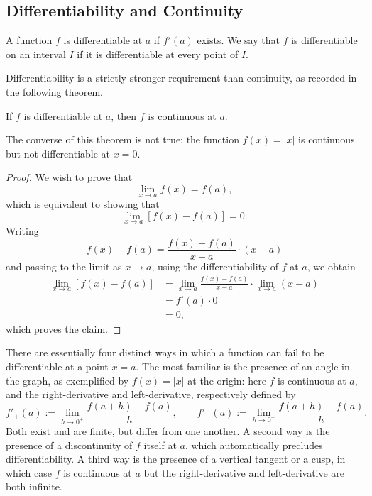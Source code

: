 

\subsection{Differentiability and Continuity}

\begin{definition}
A function $f$ is differentiable at $a$ if $f'(a)$ exists. We say that $f$ is differentiable on an interval $I$ if it is differentiable at every point of $I$.
\end{definition}

Differentiability is a strictly stronger requirement than continuity, as recorded in the following theorem.

\begin{theorem}
If $f$ is differentiable at $a$, then $f$ is continuous at $a$.
\end{theorem}

\begin{remark}
The converse of this theorem is not true: the function $f(x) = |x|$ is continuous but not differentiable at $x = 0$.
\end{remark}

\begin{proof}
We wish to prove that \[
\lim_{x \to a} f(x) = f(a),
\] which is equivalent to showing that
\[
\lim_{x \to a} [f(x) - f(a)] = 0.
\]
Writing
\[
f(x) - f(a) = \frac{f(x) - f(a)}{x - a} \cdot (x-a)
\]
 and passing to the limit as $x \to a$, using the differentiability of $f$ at $a$, we obtain
\[
\begin{aligned}
\lim_{x \to a} [f(x) - f(a)] &= \lim_{x \to a} \frac{f(x) - f(a)}{x-a} \cdot \lim_{x \to a} (x-a) \\
&= f'(a) \cdot 0 \\
&= 0,
\end{aligned}
\]
which proves the claim.
\end{proof}

There are essentially four distinct ways in which a function can fail to be differentiable at a point $x = a$. The most familiar is the presence of an angle in the graph, as exemplified by $f(x) = |x|$ at the origin: here $f$ is continuous at $a$, and the right-derivative and left-derivative, respectively defined by
\[
f'_+(a) := \lim_{h \to 0^+} \frac{f(a+h) - f(a)}{h}, \qquad f'_-(a) := \lim_{h \to 0^-} \frac{f(a+h) - f(a)}{h}.
\]
Both exist and are finite, but differ from one another. A second way is the presence of a discontinuity of $f$ itself at $a$, which automatically precludes differentiability. A third way is the presence of a vertical tangent or a cusp, in which case $f$ is continuous at $a$ but the right-derivative and left-derivative are both infinite.

